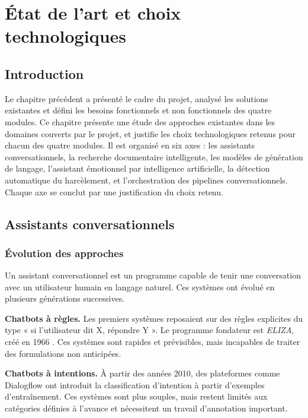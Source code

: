 \chapter{État de l'art et choix technologiques}

\section*{Introduction}

Le chapitre précédent a présenté le cadre du projet, analysé les solutions existantes
et défini les besoins fonctionnels et non fonctionnels des quatre modules.
Ce chapitre présente une étude des approches existantes dans les domaines couverts par le projet,
et justifie les choix technologiques retenus pour chacun des quatre modules.
Il est organisé en six axes : les assistants conversationnels,
la recherche documentaire intelligente, les modèles de génération de langage,
l'assistant émotionnel par intelligence artificielle,
la détection automatique du harcèlement,
et l'orchestration des pipelines conversationnels.
Chaque axe se conclut par une justification du choix retenu.

\section{Assistants conversationnels}

\subsection{Évolution des approches}

Un assistant conversationnel est un programme capable de tenir une conversation
avec un utilisateur humain en langage naturel.
Ces systèmes ont évolué en plusieurs générations successives.

\textbf{Chatbots à règles.}
Les premiers systèmes reposaient sur des règles explicites du type
« si l'utilisateur dit X, répondre Y ».
Le programme fondateur est \textit{ELIZA}, créé en 1966 \cite{eliza1966}.
Ces systèmes sont rapides et prévisibles, mais incapables de traiter
des formulations non anticipées.

\textbf{Chatbots à intentions.}
À partir des années 2010, des plateformes comme Dialogflow \cite{dialogflow} ont introduit
la classification d'intention à partir d'exemples d'entraînement.
Ces systèmes sont plus souples, mais restent limités aux catégories définies
à l'avance et nécessitent un travail d'annotation important.

